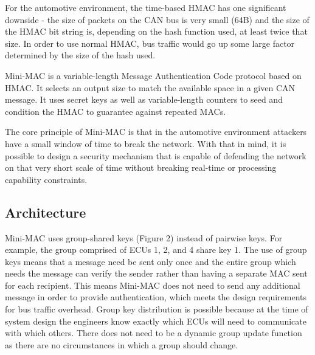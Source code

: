 For the automotive environment, the time-based HMAC has one significant downside - the size of packets on the CAN bus is very small (64B) and the size of the HMAC bit string is, depending on the hash function used, at least twice that size. In order to use normal HMAC, bus traffic would go up some large factor determined by the size of the hash used. 

Mini-MAC is a variable-length Message Authentication Code protocol based on HMAC. It selects an output size to match the available space in a given CAN message. It uses secret keys as well as variable-length counters to seed and condition the HMAC to guarantee against repeated MACs.

The core principle of Mini-MAC is that in the automotive environment attackers have a small window of time to break the network. With that in mind, it is possible to design a security mechanism that is capable of defending the network on that very short scale of time without breaking real-time or processing capability constraints.

\subsection{Architecture}


Mini-MAC uses group-shared keys (Figure 2) instead of pairwise keys. For example, the group comprised of ECUs 1, 2, and 4 share key 1. The use of group keys means that a message need be sent only once and the entire group which needs the message can verify the sender rather than having a separate MAC sent for each recipient. This means Mini-MAC does not need to send any additional message in order to provide authentication, which meets the design requirements for bus traffic overhead. Group key distribution is possible because at the time of system design the engineers know exactly which ECUs will need to communicate with which others. There does not need to be a dynamic group update function as there are no circumstances in which a group should change.

